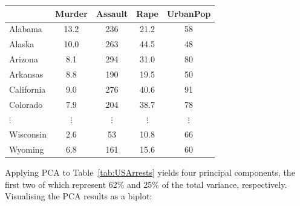 \begingroup
\noindent\begin{minipage}[t][][b]{.55\textwidth}
\begin{tabular}{l|cccc}
      & Murder & Assault & Rape & UrbanPop \\ \hline
Alabama    &  13.2  & 236  & 21.2 & 58 \\
Alaska     &  10.0  & 263  & 44.5 & 48 \\
Arizona    &   8.1  & 294  & 31.0 & 80 \\
Arkansas    &  8.8  & 190  & 19.5 & 50 \\
California  &  9.0  & 276  & 40.6 & 91 \\
Colorado    &  7.9  & 204  & 38.7 & 78 \\
$\vdots$ & $\vdots$ & $\vdots$ & $\vdots$ & $\vdots$ \\
Wisconsin  & 2.6 & 53  & 10.8 & 66 \\
Wyoming    & 6.8 & 161 & 15.6 & 60 
\end{tabular}
\end{minipage}
\begin{minipage}[t][][t]{.45\textwidth}
  \label{tab:USArrests}
\end{minipage}
\endgroup\medskip

Applying PCA to Table~\ref{tab:USArrests} yields four principal
components, the first two of which represent 62\% and 25\% of the
total variance, respectively.  Visualising the PCA results as a
biplot:

